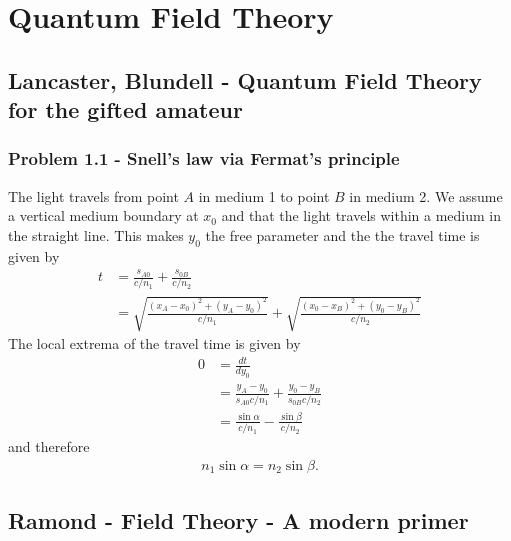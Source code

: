 \documentclass[10pt,a4paper]{article}
\theoremstyle{definition}
\begin{document}
\section{Quantum Field Theory}
\subsection{{\sc Lancaster, Blundell} - Quantum Field Theory for the gifted amateur}
\subsubsection{Problem 1.1 - Snell's law via Fermat's principle}
The light travels from point $A$ in medium 1 to point $B$ in medium 2. We assume a vertical medium boundary at $x_0$ and that the light travels within a medium in the straight line. This makes $y_0$ the free parameter and the the travel time is given by
\begin{align}
    t&=\frac{s_{A0}}{c/n_1}+\frac{s_{0B}}{c/n_2}\\
    &=\sqrt{\frac{(x_A-x_0)^2+(y_A-y_0)^2}{c/n_1}}+\sqrt{\frac{(x_0-x_B)^2+(y_0-y_B)^2}{c/n_2}}
\end{align}
The local extrema of the travel time is given by
\begin{align}
    0&=\frac{dt}{dy_0}\\
    &=\frac{y_A-y_0}{s_{A0}c/n_1}+\frac{y_0-y_B}{s_{0B}c/n_2}\\
    &=\frac{\sin\alpha}{c/n_1}-\frac{\sin\beta}{c/n_2}
\end{align}
and therefore
\begin{align}
n_1\sin\alpha=n_2\sin\beta.
\end{align}


\subsection{{\sc Ramond} - Field Theory - A modern primer} 
\end{document}
